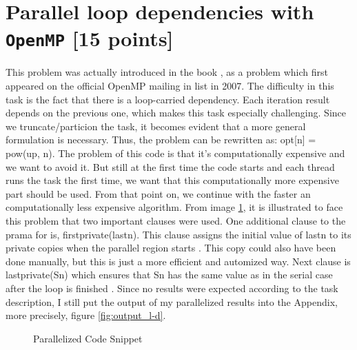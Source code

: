 \documentclass[unicode,11pt,a4paper,oneside,numbers=endperiod,openany]{scrartcl}
\begin{document}
\section{Parallel loop dependencies with \texttt{OpenMP} [15 points]}
\indent
This problem was actually introduced in the book \cite{HPC}, as a problem 
which first appeared on the official OpenMP mailing in list in 2007. The 
difficulty in this task is the fact that there is a loop-carried dependency.
Each iteration result depends on the previous one, which makes this task especially 
challenging. Since we truncate/particion the task, it becomes evident that 
a more general formulation is necessary. Thus, the problem can be rewritten as: 
opt[n] = pow(up, n). The problem of this code is that it's computationally expensive 
and we want to avoid it. But still at the first time the code starts and each thread 
runs the task the first time, we want that this computationally more expensive part 
should be used. From that point on, we continue with the faster an computationally 
less expensive algorithm.
\newline \indent
From image \ref{fig:loop-dep}, it is illustrated to face this problem that two 
important clauses were used. One additional clause to the prama for is, firstprivate(lastn).
This clause assigns the initial value of lastn to its private copies when the parallel 
region starts \cite{HPC}. This copy could also have been done manually, but this is just 
a more efficient and automized way. Next clause is lastprivate(Sn) which ensures that 
Sn has the same value as in the serial case after the loop is finished \cite{HPC}. Since 
no results were expected according to the task description, I still put the output of my 
parallelized results into the Appendix, more precisely, figure \ref{fig:output_l-d}.
\begin{figure}[H]
  \centering
  {\fontsize{8}{10}\selectfont
  }
  \caption{Parallelized Code Snippet}
  \label{fig:loop-dep}
\end{figure}
\end{document}
